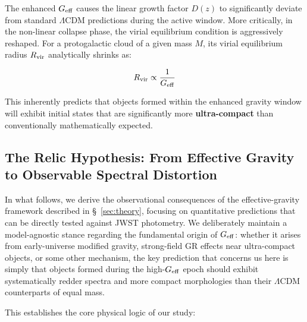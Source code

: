 \documentclass[twocolumn]{aastex631}
\begin{document}
The enhanced $G_{\rm eff}$ causes the linear growth factor $D(z)$ to significantly deviate from standard $\Lambda$CDM predictions \citep{Planck2020} during the active window. More critically, in the non-linear collapse phase, the virial equilibrium condition is aggressively reshaped. For a protogalactic cloud of a given mass $M$, its virial equilibrium radius $R_{\rm vir}$ analytically shrinks as:

\begin{equation}
    R_{\rm vir} \propto \frac{1}{G_{\rm eff}}
\end{equation}

This inherently predicts that objects formed within the enhanced gravity window will exhibit initial states that are significantly more \textbf{ultra-compact} than conventionally mathematically expected.

\subsection{The Relic Hypothesis: From Effective Gravity to Observable Spectral Distortion}

In what follows, we derive the observational consequences of the effective-gravity framework described in \S~\ref{sec:theory}, focusing on quantitative predictions that can be directly tested against JWST photometry. We deliberately maintain a model-agnostic stance regarding the fundamental origin of $G_{\rm eff}$: whether it arises from early-universe modified gravity, strong-field GR effects near ultra-compact objects, or some other mechanism, the key prediction that concerns us here is simply that objects formed during the high-$G_{\rm eff}$ epoch should exhibit systematically redder spectra and more compact morphologies than their $\Lambda$CDM counterparts of equal mass.

This establishes the core physical logic of our study:
\end{document}
